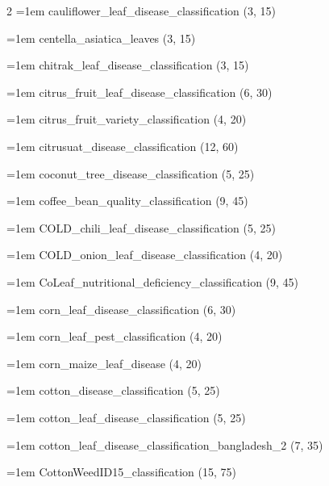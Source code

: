 \begin{multicols}{2}
\hangindent=1em cauliflower\_\allowbreak{}leaf\_\allowbreak{}disease\_\allowbreak{}classification (3, 15)\par
\hangindent=1em centella\_\allowbreak{}asiatica\_\allowbreak{}leaves (3, 15)\par
\hangindent=1em chitrak\_\allowbreak{}leaf\_\allowbreak{}disease\_\allowbreak{}classification (3, 15)\par
\hangindent=1em citrus\_\allowbreak{}fruit\_\allowbreak{}leaf\_\allowbreak{}disease\_\allowbreak{}classification (6, 30)\par
\hangindent=1em citrus\_\allowbreak{}fruit\_\allowbreak{}variety\_\allowbreak{}classification (4, 20)\par
\hangindent=1em citrusuat\_\allowbreak{}disease\_\allowbreak{}classification (12, 60)\par
\hangindent=1em coconut\_\allowbreak{}tree\_\allowbreak{}disease\_\allowbreak{}classification (5, 25)\par
\hangindent=1em coffee\_\allowbreak{}bean\_\allowbreak{}quality\_\allowbreak{}classification (9, 45)\par
\hangindent=1em COLD\_\allowbreak{}chili\_\allowbreak{}leaf\_\allowbreak{}disease\_\allowbreak{}classification (5, 25)\par
\hangindent=1em COLD\_\allowbreak{}onion\_\allowbreak{}leaf\_\allowbreak{}disease\_\allowbreak{}classification (4, 20)\par
\hangindent=1em CoLeaf\_\allowbreak{}nutritional\_\allowbreak{}deficiency\_\allowbreak{}classification (9, 45)\par
\hangindent=1em corn\_\allowbreak{}leaf\_\allowbreak{}disease\_\allowbreak{}classification (6, 30)\par
\hangindent=1em corn\_\allowbreak{}leaf\_\allowbreak{}pest\_\allowbreak{}classification (4, 20)\par
\hangindent=1em corn\_\allowbreak{}maize\_\allowbreak{}leaf\_\allowbreak{}disease (4, 20)\par
\hangindent=1em cotton\_\allowbreak{}disease\_\allowbreak{}classification (5, 25)\par
\hangindent=1em cotton\_\allowbreak{}leaf\_\allowbreak{}disease\_\allowbreak{}classification (5, 25)\par
\hangindent=1em cotton\_\allowbreak{}leaf\_\allowbreak{}disease\_\allowbreak{}classification\_\allowbreak{}bangladesh\_\allowbreak{}2 (7, 35)\par
\hangindent=1em CottonWeedID15\_\allowbreak{}classification (15, 75)\par

\end{multicols}
